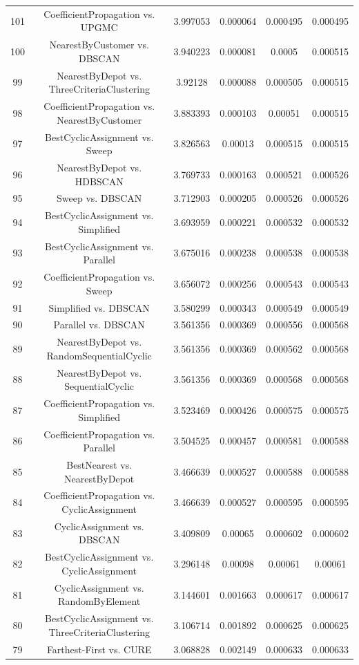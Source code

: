 \documentclass[a4paper,10pt]{article}
\begin{document}
\begin{landscape}
\begin{table}[!htp]
\begin{tabular}{cccccc}
101&CoefficientPropagation vs. UPGMC&3.997053&0.000064&0.000495&0.000495\\
100&NearestByCustomer vs. DBSCAN&3.940223&0.000081&0.0005&0.000515\\
99&NearestByDepot vs. ThreeCriteriaClustering&3.92128&0.000088&0.000505&0.000515\\
98&CoefficientPropagation vs. NearestByCustomer&3.883393&0.000103&0.00051&0.000515\\
97&BestCyclicAssignment vs. Sweep&3.826563&0.00013&0.000515&0.000515\\
96&NearestByDepot vs. HDBSCAN&3.769733&0.000163&0.000521&0.000526\\
95&Sweep vs. DBSCAN&3.712903&0.000205&0.000526&0.000526\\
94&BestCyclicAssignment vs. Simplified&3.693959&0.000221&0.000532&0.000532\\
93&BestCyclicAssignment vs. Parallel&3.675016&0.000238&0.000538&0.000538\\
92&CoefficientPropagation vs. Sweep&3.656072&0.000256&0.000543&0.000543\\
91&Simplified vs. DBSCAN&3.580299&0.000343&0.000549&0.000549\\
90&Parallel vs. DBSCAN&3.561356&0.000369&0.000556&0.000568\\
89&NearestByDepot vs. RandomSequentialCyclic&3.561356&0.000369&0.000562&0.000568\\
88&NearestByDepot vs. SequentialCyclic&3.561356&0.000369&0.000568&0.000568\\
87&CoefficientPropagation vs. Simplified&3.523469&0.000426&0.000575&0.000575\\
86&CoefficientPropagation vs. Parallel&3.504525&0.000457&0.000581&0.000588\\
85&BestNearest vs. NearestByDepot&3.466639&0.000527&0.000588&0.000588\\
84&CoefficientPropagation vs. CyclicAssignment&3.466639&0.000527&0.000595&0.000595\\
83&CyclicAssignment vs. DBSCAN&3.409809&0.00065&0.000602&0.000602\\
82&BestCyclicAssignment vs. CyclicAssignment&3.296148&0.00098&0.00061&0.00061\\
81&CyclicAssignment vs. RandomByElement&3.144601&0.001663&0.000617&0.000617\\
80&BestCyclicAssignment vs. ThreeCriteriaClustering&3.106714&0.001892&0.000625&0.000625\\
79&Farthest-First vs. CURE&3.068828&0.002149&0.000633&0.000633\\

\end{tabular}
\end{table}
\end{landscape}
\end{document}
